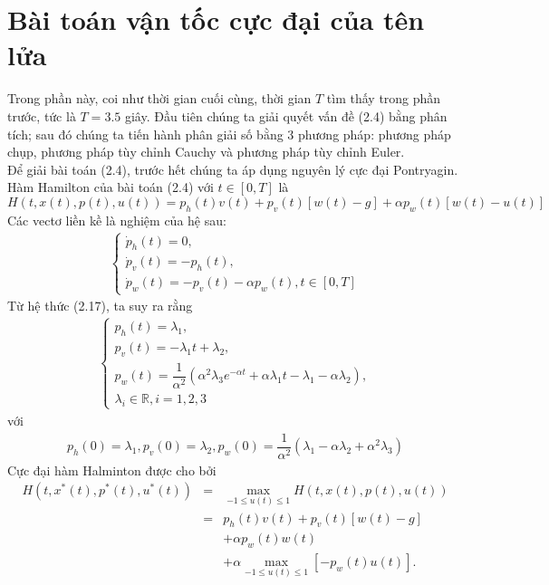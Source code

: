\documentclass[12pt,a4paper]{report}
\begin{document}
	\section{Bài toán vận tốc cực đại của tên lửa}
	Trong phần này, coi như thời gian cuối cùng, thời gian $T$ tìm thấy trong phần trước, tức là $T = 3.5$ giây. Đầu tiên chúng ta giải quyết vấn đề (2.4) bằng phân tích; sau đó chúng ta tiến hành phân giải số bằng 3 phương pháp: phương pháp chụp, phương pháp tùy chỉnh Cauchy và phương pháp tùy chỉnh Euler. \\
	Để giải bài toán (2.4), trước hết chúng ta áp dụng nguyên lý cực đại Pontryagin. Hàm Hamilton của
	bài toán (2.4) với $t \in [0, T]$ là
	\begin{equation}
		H(t, x(t), p(t), u(t)) = p_h(t)v(t) + p_v(t)[w(t)-g] + \alpha p_w(t)[w(t)-u(t)]
	\end{equation} Các vectơ liền kề là nghiệm của hệ sau:
\begin{eqnarray}
	\begin{cases}
		\dot{p}_h(t) = 0, \\ \dot{p}_v(t) = -p_h(t), \\ \dot{p}_w(t) = -p_v(t) - \alpha p_w(t), t \in [0, T]
	\end{cases}
\end{eqnarray}
Từ hệ thức (2.17), ta suy ra rằng
\begin{eqnarray}
	\begin{cases}
		p_h(t) = \lambda_1, \\ p_v(t) = -\lambda_1t+\lambda_2, \\ p_w(t) = \dfrac{1}{\alpha^2}(\alpha^2\lambda_3e^{-\alpha t} + \alpha\lambda_1t - \lambda_1 - \alpha\lambda_2), \\ \lambda_i \in \mathbb{R}, i = 1,2,3
	\end{cases}
\end{eqnarray} với \begin{eqnarray}
p_h(0) = \lambda_1, p_v(0) = \lambda_2, p_w(0) = \dfrac{1}{\alpha^2}(\lambda_1-\alpha\lambda_2+\alpha^2\lambda_3)
\end{eqnarray}
Cực đại hàm Halminton được cho bởi \begin{eqnarray}
	H(t, x^*(t), p^*(t), u^*(t)) &=& \max_{-1 \leq u(t) \leq 1}H(t, x(t), p(t), u(t)) \nonumber \\ &=& p_h(t)v(t) + p_v(t)[w(t)-g]\nonumber \\ &&+\alpha p_w(t)w(t) \nonumber \\&& + \alpha \max_{-1 \leq u(t) \leq 1}[-p_w(t)u(t)]. \nonumber
\end{eqnarray}
\end{document}
